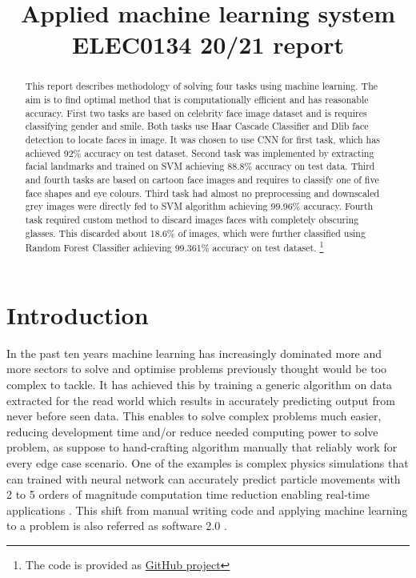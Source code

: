 \documentclass{article}
\title{Applied machine learning system ELEC0134 20/21 report}
\begin{document}
\maketitle

\begin{abstract}

This report describes methodology of solving four tasks using machine learning. The aim is to find optimal method that is computationally efficient and has reasonable accuracy. First two tasks are based on celebrity face image dataset and is requires classifying gender and smile. Both tasks use Haar Cascade Classifier and Dlib face detection to locate faces in image. It was chosen to use CNN for first task, which has achieved 92\% accuracy on test dataset. Second task was implemented by extracting facial landmarks and trained on SVM achieving 88.8\% accuracy on test data.  Third and fourth tasks are based on cartoon face images and requires to classify one of five face shapes and eye colours. Third task had almost no preprocessing and downscaled grey images were directly fed to SVM algorithm achieving 99.96\% accuracy. Fourth task required custom method to discard images faces with completely obscuring glasses. This discarded about 18.6\% of images, which were further classified using Random Forest Classifier achieving 99.361\% accuracy on test dataset. \footnote{The code is provided as \href{https://github.com/zceemja/AMLS_ASSIGNMENT_20-21}{GitHub project}}
\end{abstract}

\section{Introduction}
\label{sec:intro}

In the past ten years machine learning has increasingly dominated more and more sectors to solve and optimise problems previously thought would be too complex to tackle. It has achieved this by training a generic algorithm on data extracted for the read world which results in accurately predicting output from never before seen data. This enables to solve complex problems much easier, reducing development time and/or reduce needed computing power to solve problem, as suppose to hand-crafting algorithm manually that reliably work for every edge case scenario. One of the examples is complex physics simulations that can trained with neural network can accurately predict particle movements with 2 to 5 orders of magnitude computation time reduction enabling real-time applications \cite{Zsolnai13fc,physics}. This shift from manual writing code and applying machine learning to a problem is also referred as software 2.0 \cite{software2}. 
\end{document}
